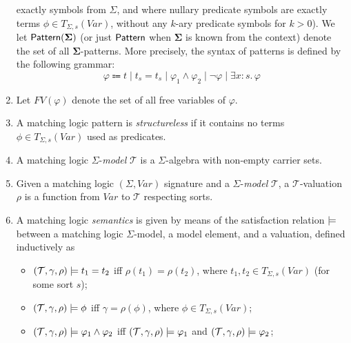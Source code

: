 \begin{definition}
\begin{enumerate}
          exactly symbols from $\Sigma$, and where nullary predicate symbols are exactly
          terms $\phi \in T_{\Sigma, s}(\mathit{Var})$, without any $k$-ary predicate symbols for $k > 0$).
          We let $\mathsf{Pattern}(\mathbf{\Sigma})$ (or just $\mathsf{Pattern}$ when $\mathbf{\Sigma}$ is known from the context)
          denote the set of all $\mathbf{\Sigma}$-patterns.
          More precisely, the syntax of patterns is defined by the following grammar:
          \begin{equation}
            \varphi \Coloneqq t \mid t_s = t_s \mid \varphi_1 \land \varphi_2 \mid \neg \varphi \mid \exists x : s.\, \varphi
          \end{equation}
    \item Let $\mathit{FV}(\varphi)$ denote the set of all free variables of $\varphi$.
    \item A matching logic pattern is \emph{structureless} if it contains
          no terms $\phi \in T_{\Sigma, s}(\mathit{Var})$ used as predicates.
    \item A matching logic $\Sigma$-\emph{model} $\mathcal{T}$ is a $\Sigma$-algebra with non-empty carrier sets.
    \item Given a matching logic $(\Sigma, \mathit{Var})$ signature and a $\Sigma$-\emph{model} $\mathcal{T}$,
          a $\mathcal{T}$-valuation $\rho$ is a function from $\mathit{Var}$ to $\mathcal{T}$ respecting sorts.
    \item A matching logic \emph{semantics} is given by means of
          the satisfaction relation $\models$ between a matching logic $\Sigma$-model,
          a model element, and a valuation,
          defined inductively as
          \begin{itemize}
              \item $(\mathcal{T}, \gamma, \rho) \models t_1 = t_2$ iff $\rho(t_1) = \rho(t_2)$, where $t_1,t_2 \in T_{\Sigma, s}(\mathit{Var})$ (for some sort $s$);
              \item $(\mathcal{T}, \gamma, \rho) \models \phi$ iff $\gamma = \rho(\phi)$, where $\phi \in T_{\Sigma, s}(\mathit{Var})$;
              \item $(\mathcal{T}, \gamma, \rho) \models \varphi_1 \land \varphi_2$ iff
                $(\mathcal{T}, \gamma, \rho) \models \varphi_1$ and
                $(\mathcal{T}, \gamma, \rho) \models \varphi_2$;

\end{itemize}
\end{enumerate}
\end{definition}
